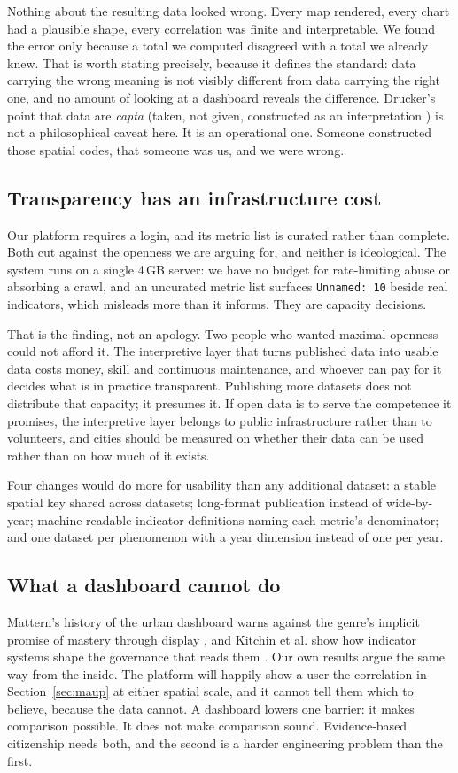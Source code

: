 \documentclass[conference,a4paper]{IEEEtran}
\begin{document}
Nothing about the resulting data looked wrong. Every map rendered, every chart
had a plausible shape, every correlation was finite and interpretable. We found
the error only because a total we computed disagreed with a total we already
knew. That is worth stating precisely, because it defines the standard: data
carrying the wrong meaning is not visibly different from data carrying the right
one, and no amount of looking at a dashboard reveals the difference. Drucker's
point that data are \emph{capta} (taken, not given, constructed as an
interpretation \cite{drucker2011humanities}) is not a philosophical caveat
here. It is an operational one. Someone constructed those spatial codes, that
someone was us, and we were wrong.

\subsection{Transparency has an infrastructure cost}
Our platform requires a login, and its metric list is curated rather than
complete. Both cut against the openness we are arguing for, and neither is
ideological. The system runs on a single 4\,GB server: we have no budget for
rate-limiting abuse or absorbing a crawl, and an uncurated metric list surfaces
\texttt{Unnamed:~10} beside real indicators, which misleads more than it informs.
They are capacity decisions.

That is the finding, not an apology. Two people who wanted maximal openness could
not afford it. The interpretive layer that turns published data into usable data
costs money, skill and continuous maintenance, and whoever can pay for it decides
what is in practice transparent. Publishing more datasets does not distribute
that capacity; it presumes it. If open data is to serve the competence it
promises, the interpretive layer belongs to public infrastructure rather than to
volunteers, and cities should be measured on whether their data can be used
rather than on how much of it exists.

Four changes would do more for usability than any additional dataset: a stable
spatial key shared across datasets; long-format publication instead of
wide-by-year; machine-readable indicator definitions naming each metric's
denominator; and one dataset per phenomenon with a year dimension instead of one
per year.

\subsection{What a dashboard cannot do}
Mattern's history of the urban dashboard warns against the genre's implicit
promise of mastery through display \cite{mattern2015missioncontrol}, and Kitchin
et al. show how indicator systems shape the governance that reads them
\cite{kitchin2015knowing}. Our own results argue the same way from the inside.
The platform will happily show a user the correlation in
Section~\ref{sec:maup} at either spatial scale, and it cannot tell them which to
believe, because the data cannot. A dashboard lowers one barrier: it makes
comparison possible. It does not make comparison sound. Evidence-based
citizenship needs both, and the second is a harder engineering problem than the
first.
\end{document}
